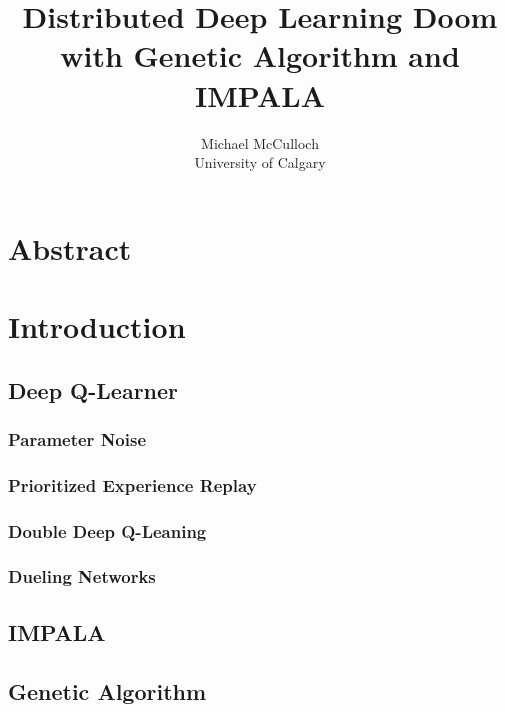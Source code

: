 \documentclass[letterpaper,twocolumn,10pt]{article}
\begin{document}
    
    \date{}
    
    \title{\Large \bf Distributed Deep Learning Doom with Genetic Algorithm and IMPALA}
    
    \author{Michael McCulloch \\ University of Calgary}
    
    \maketitle
    
    \thispagestyle{empty}

    \section{Abstract}
    \section{Introduction}
        \subsection{Deep Q-Learner}
            \subsubsection{Parameter Noise}
            \subsubsection{Prioritized Experience Replay}
            \subsubsection{Double Deep Q-Leaning}
            \subsubsection{Dueling Networks}
        \subsection{IMPALA}    
        \subsection{Genetic Algorithm}
\end{document}
